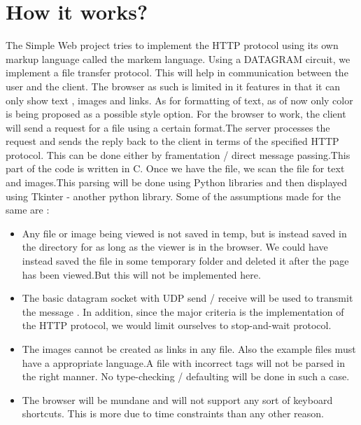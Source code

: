 \documentclass[10pt]{article}
\begin{document}
\section{\color{Violet}How it works?}
The Simple Web project tries to implement the HTTP protocol using its own markup
language called the markem language. Using a DATAGRAM circuit, we implement a
file transfer protocol. This will help in communication between the user and the client.
The browser as such is limited in it features in that it can only show text , images and
links. As for formatting of text, as of now only color is being proposed as a possible
style option.
For the browser to work, the client will send a request for a file using a certain
format.The server processes the request and sends the reply back to the client in terms
of the specified HTTP protocol. This can be done either by framentation / direct
message passing.This part of the code is written in C. Once we have the file, we scan
the file for text and images.This parsing will be done using Python libraries and then
displayed using Tkinter - another python library.
Some of the assumptions made for the same are :
\begin{itemize}
 \item Any file or image being viewed is not saved in temp, but is instead saved in the
directory for as long as the viewer is in the browser. We could have instead saved
the file in some temporary folder and deleted it after the page has been viewed.But
this will not be implemented here.
\item The basic datagram socket with UDP send / receive will be used to transmit the
message . In addition, since the major criteria is the implementation of the HTTP
protocol, we would limit ourselves to stop-and-wait protocol.
\item The images cannot be created as links in any file. Also the example files must have
a appropriate language.A file with incorrect tags will not be parsed in the right
manner. No type-checking / defaulting will be done in such a case.
\item The browser will be mundane and will not support any sort of keyboard shortcuts.
This is more due to time constraints than any other reason.
\end{itemize}
\end{document}
